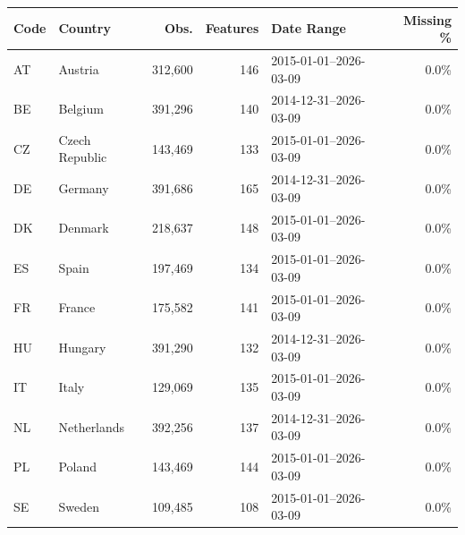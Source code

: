 \begin{tabular}{ll r r l r}
\toprule
\textbf{Code} & \textbf{Country} & \textbf{Obs.} & \textbf{Features} & \textbf{Date Range} & \textbf{Missing \%} \\
\midrule
AT & Austria & 312,600 & 146 & 2015-01-01--2026-03-09 & 0.0\% \\
BE & Belgium & 391,296 & 140 & 2014-12-31--2026-03-09 & 0.0\% \\
CZ & Czech Republic & 143,469 & 133 & 2015-01-01--2026-03-09 & 0.0\% \\
DE & Germany & 391,686 & 165 & 2014-12-31--2026-03-09 & 0.0\% \\
DK & Denmark & 218,637 & 148 & 2015-01-01--2026-03-09 & 0.0\% \\
ES & Spain & 197,469 & 134 & 2015-01-01--2026-03-09 & 0.0\% \\
FR & France & 175,582 & 141 & 2015-01-01--2026-03-09 & 0.0\% \\
HU & Hungary & 391,290 & 132 & 2014-12-31--2026-03-09 & 0.0\% \\
IT & Italy & 129,069 & 135 & 2015-01-01--2026-03-09 & 0.0\% \\
NL & Netherlands & 392,256 & 137 & 2014-12-31--2026-03-09 & 0.0\% \\
PL & Poland & 143,469 & 144 & 2015-01-01--2026-03-09 & 0.0\% \\
SE & Sweden & 109,485 & 108 & 2015-01-01--2026-03-09 & 0.0\% \\
\bottomrule
\end{tabular}